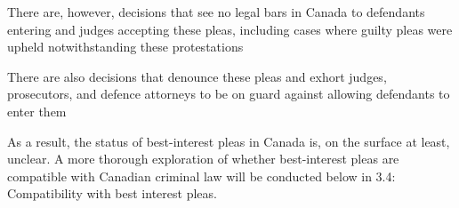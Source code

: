 There are, however, decisions that see no legal bars in Canada to defendants entering and judges accepting these pleas, including cases where guilty pleas were upheld notwithstanding these protestations

There are also decisions that denounce these pleas and exhort judges, prosecutors, and defence attorneys to be on guard against allowing defendants to enter them

As a result, the status of best-interest pleas in Canada is, on the surface at least, unclear. A more thorough exploration of whether best-interest pleas are compatible with Canadian criminal law will be conducted below in 3.4: Compatibility with best interest pleas.
